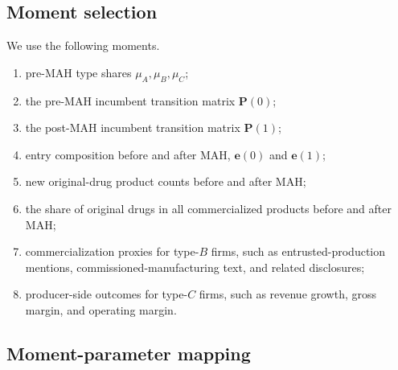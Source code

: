 \documentclass[12pt]{article}
\newcommand{\1}{\mathbf{1}}
\begin{document}
\subsection{Moment selection}

We use the following moments.
\begin{enumerate}[leftmargin=2em]
    \item pre-MAH type shares $\mu_A,\mu_B,\mu_C$;
    \item the pre-MAH incumbent transition matrix $\mathbf P(0)$;
    \item the post-MAH incumbent transition matrix $\mathbf P(1)$;
    \item entry composition before and after MAH, $\mathbf e(0)$ and $\mathbf e(1)$;
    \item new original-drug product counts before and after MAH;
    \item the share of original drugs in all commercialized products before and after MAH;
    \item commercialization proxies for type-$B$ firms, such as entrusted-production mentions, commissioned-manufacturing text, and related disclosures;
    \item producer-side outcomes for type-$C$ firms, such as revenue growth, gross margin, and operating margin.
\end{enumerate}

\subsection{Moment-parameter mapping}
\end{document}
